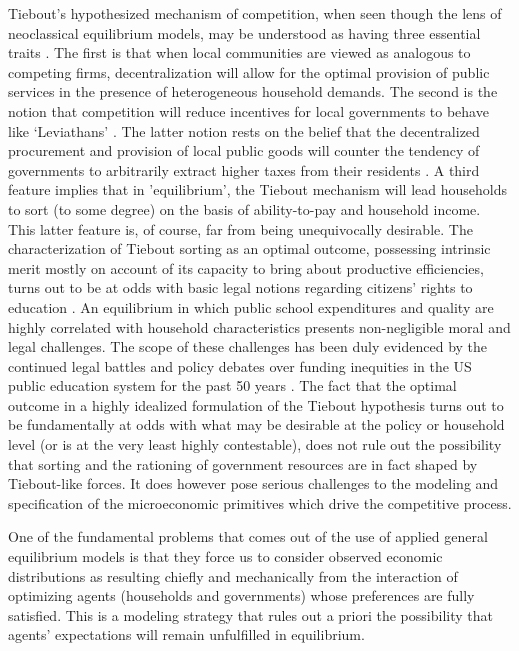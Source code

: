 Tiebout's hypothesized mechanism of competition, when seen though the
lens of neoclassical equilibrium models, may be understood as having
three essential traits \citep{nechyba_tiebout_2020}. The first is
that when local communities are viewed as analogous to competing
firms, decentralization will allow for the optimal provision of public
services in the presence of heterogeneous household demands. The
second is the notion that competition will reduce incentives for local
governments to behave like `Leviathans' \citep{jha}. The latter
notion rests on the belief that the decentralized procurement and
provision of local public goods will counter the tendency of
governments to arbitrarily extract higher taxes from their residents
\citep{brennang,jimenez_is_2010}. A third feature implies that in
'equilibrium', the Tiebout mechanism will lead households to sort (to
some degree) on the basis of ability-to-pay and household income. This
latter feature is, of course, far from being unequivocally
desirable. The characterization of Tiebout sorting as an optimal
outcome, possessing intrinsic merit mostly on account of its capacity
to bring about productive efficiencies, turns out to be at odds with
basic legal notions regarding citizens' rights to education
\citep{jha}. An equilibrium in which public school expenditures
and quality are highly correlated with household characteristics
presents non-negligible moral and legal challenges. The scope of these
challenges has been duly evidenced by the continued legal battles and
policy debates over funding inequities in the US public education
system for the past 50 years
\citep{bakere,hertert_school_1994}. The fact that the optimal
outcome in a highly idealized formulation of the Tiebout hypothesis
turns out to be fundamentally at odds with what may be desirable at
the policy or household level (or is at the very least highly
contestable), does not rule out the possibility that sorting and the
rationing of government resources are in fact shaped by Tiebout-like
forces. It does however pose serious challenges to the modeling and
specification of the microeconomic primitives which drive the
competitive process.

One of the fundamental problems that comes out of the use of applied
general equilibrium models is that they force us to consider observed
economic distributions as resulting chiefly and mechanically from the
interaction of optimizing agents (households and governments) whose
preferences are fully satisfied. This is a modeling strategy that
rules out a priori the possibility that agents' expectations will
remain unfulfilled in equilibrium.

